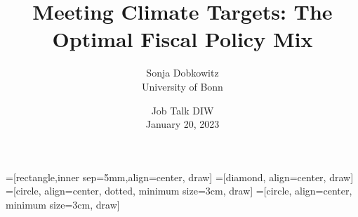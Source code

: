\documentclass[11pt,aspectratio=169]{beamer}
\author[Sonja Dobkowitz]{\small Sonja Dobkowitz\\ \footnotesize{University of Bonn%
}\\ }
\title{Meeting Climate Targets: The Optimal Fiscal Policy Mix}
\date{\small{ Job Talk DIW\\ January 20, 2023 }}
\begin{document}
=[rectangle,inner sep=5mm,align=center, draw]
=[diamond, align=center, draw]
=[circle, align=center, dotted, minimum size=3cm, draw]
=[circle, align=center, minimum size=3cm, draw]
{
	\begin{frame}
		\titlepage
	\end{frame}
}



\end{document}
